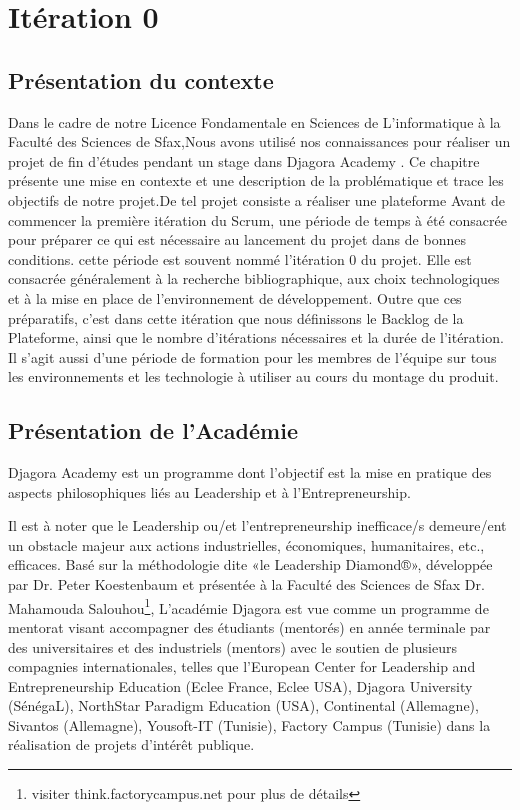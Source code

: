 \section{Itération 0}

\subsection{Présentation du contexte}

Dans le cadre de notre Licence Fondamentale en Sciences de L'informatique à 
la Faculté des Sciences de Sfax,Nous avons utilisé nos connaissances pour 
réaliser un projet de fin d'études pendant un stage dans Djagora Academy .
Ce chapitre présente une mise en contexte et une description de la problématique
et trace les objectifs de notre projet.De tel projet consiste a réaliser une
plateforme
Avant de commencer la première itération du Scrum, une période de temps à été
consacrée pour préparer ce qui est nécessaire au lancement du projet dans de bonnes
conditions. cette période est souvent nommé l’itération 0 du projet. Elle est consacrée
généralement à la recherche bibliographique, aux choix technologiques et à la mise en
place de l’environnement de développement. Outre que ces préparatifs, c’est dans cette
itération que nous définissons le Backlog de la Plateforme, ainsi que le nombre
d’itérations nécessaires et la durée de l’itération. Il s’agit aussi d’une période de
formation pour les membres de l’équipe sur tous les environnements et les technologie à
utiliser au cours du montage du produit.

\subsection{Présentation de l'Académie}

Djagora Academy est un programme dont l'objectif est la mise en pratique des
aspects philosophiques liés au Leadership et à l'Entrepreneurship.

Il est à noter que le Leadership ou/et l'entrepreneurship inefficace/s
demeure/ent un obstacle majeur aux actions industrielles, économiques,
humanitaires, etc., efficaces.
Basé sur la méthodologie dite «le Leadership Diamond®», développée par Dr. Peter
Koestenbaum et présentée à la Faculté des Sciences de Sfax Dr. Mahamouda
Salouhou\footnote{visiter think.factorycampus.net pour plus de détails},
L'académie Djagora est vue comme un programme de mentorat visant accompagner des
étudiants (mentorés) en année terminale par des universitaires et des
industriels (mentors) avec le soutien de plusieurs compagnies internationales,
telles que l'European Center for Leadership and Entrepreneurship Education
(Eclee France, Eclee USA), Djagora University (SénégaL), NorthStar Paradigm
Education (USA), Continental (Allemagne), Sivantos (Allemagne), Yousoft-IT
(Tunisie), Factory Campus (Tunisie) dans la réalisation de projets d’intérêt
publique.

